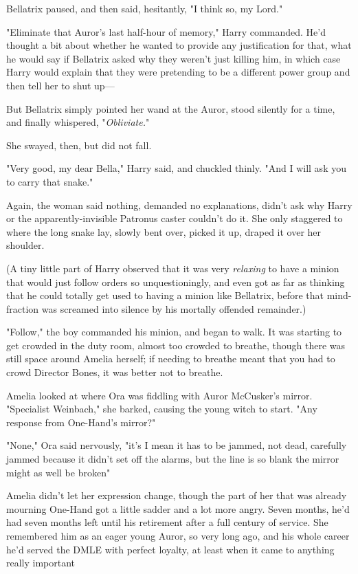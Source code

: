 Bellatrix paused, and then said, hesitantly, "I think so, my Lord."

"Eliminate that Auror's last half-hour of memory," Harry commanded. He'd
thought a bit about whether he wanted to provide any justification for that,
what he would say if Bellatrix asked why they weren't just killing him, in
which case Harry would explain that they were pretending to be a different
power group and then tell her to shut up---

But Bellatrix simply pointed her wand at the Auror, stood silently for a time,
and finally whispered, "\emph{Obliviate.}"

She swayed, then, but did not fall.

"Very good, my dear Bella," Harry said, and chuckled thinly. "And I will ask
you to carry that snake."

Again, the woman said nothing, demanded no explanations, didn't ask why Harry
or the apparently-invisible Patronus caster couldn't do it. She only staggered
to where the long snake lay, slowly bent over, picked it up, draped it over her
shoulder.

(A tiny little part of Harry observed that it was very \emph{relaxing} to have
a minion that would just follow orders so unquestioningly, and even got as far
as thinking that he could totally get used to having a minion like Bellatrix,
before that mind-fraction was screamed into silence by his mortally offended
remainder.)

"Follow," the boy commanded his minion, and began to walk.
\sbreak
It was starting to get crowded in the duty room, almost too crowded to breathe,
though there was still space around Amelia herself; if needing to breathe meant
that you had to crowd Director Bones, it was better not to breathe.

Amelia looked at where Ora was fiddling with Auror McCusker's mirror.
"Specialist Weinbach," she barked, causing the young witch to start. "Any
response from One-Hand's mirror?"

"None," Ora said nervously, "it's{\el} I mean it has to be jammed, not dead,
carefully jammed because it didn't set off the alarms, but the line is so blank
the mirror might as well be broken{\el}"

Amelia didn't let her expression change, though the part of her that was
already mourning One-Hand got a little sadder and a lot more angry. Seven
months, he'd had seven months left until his retirement after a full century of
service. She remembered him as an eager young Auror, so very long ago, and his
whole career he'd served the DMLE with perfect loyalty, at least when it came
to anything really important{\el}

